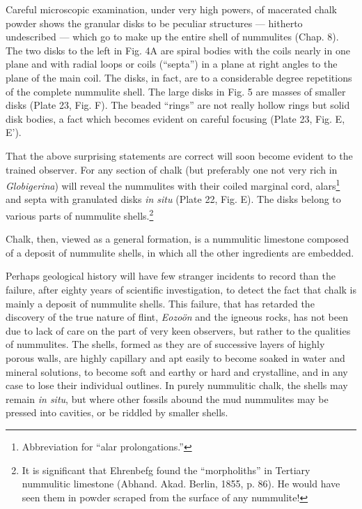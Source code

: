 \documentclass[a4paper, 12pt, oneside]{article}
\begin{document}
Careful microscopic examination, under very high powers, of macerated chalk powder shows the granular disks to be peculiar structures --- hitherto undescribed --- which go to make up the entire shell of nummulites (Chap. 8). The two disks to the left in Fig. 4A are spiral bodies with the coils nearly in one plane and with radial loops or coils (``septa'') in a plane at right angles to the plane of the main coil. The disks, in fact, are to a considerable degree repetitions of the complete nummulite shell. The large disks in Fig. 5 are masses of smaller disks (Plate 23, Fig. F). The beaded ``rings'' are not really hollow rings but solid disk bodies, a fact which becomes evident on careful focusing (Plate 23, Fig. E, E').

That the above surprising statements are correct will soon become evident to the trained observer. For any section of chalk (but preferably one not very rich in \emph{Globigerina}) will reveal the nummulites with their coiled marginal cord, alars\footnote{Abbreviation for ``alar prolongations.''} and septa with granulated disks \emph{in situ} (Plate 22, Fig. E). The disks belong to various parts of nummulite shells.\footnote{It is significant that Ehrenbefg found the ``morpholiths'' in Tertiary nummulitic limestone (Abhand. Akad. Berlin, 1855, p. 86). He would have seen them in powder scraped from the surface of any nummulite!}

Chalk, then, viewed as a general formation, is a nummulitic limestone composed of a deposit of nummulite shells, in which all the other ingredients are embedded.

Perhaps geological history will have few stranger incidents to record than the failure, after eighty years of scientific investigation, to detect the fact that chalk is mainly a deposit of nummulite shells. This failure, that has retarded the discovery of the true nature of flint, \emph{Eozoön} and the igneous rocks, has not been due to lack of care on the part of very keen observers, but rather to the qualities of nummulites. The shells, formed as they are of successive layers of highly porous walls, are highly capillary and apt easily to become soaked in water and mineral solutions, to become soft and earthy or hard and crystalline, and in any case to lose their individual outlines. In purely nummulitic chalk, the shells may remain \emph{in situ}, but where other fossils abound the mud nummulites may be pressed into cavities, or be riddled by smaller shells.
\end{document}

